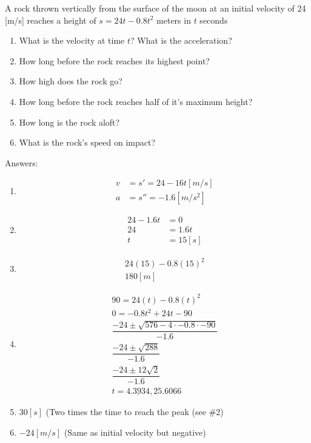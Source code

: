 \begin{example}
    A rock thrown vertically from the surface of the moon at an initial velocity of 24 [m/s] reaches a height of $s = 24t - 0.8t^2$ meters in $t$ seconds
    \begin{enumerate}
        \item What is the velocity at time $t$? What is the acceleration?
        \item How long before the rock reaches its highest point?
        \item How high does the rock go?
        \item How long before the rock reaches half of it's maximum height?
        \item How long is the rock aloft?
        \item What is the rock's speed on impact?
    \end{enumerate}
    Answers:
    \begin{enumerate}
        \item \begin{align*}
            v &= s' = 24 - 16t [m/s] \\
            a &= s'' = -1.6 [m/s^2]
        \end{align*}
        \item \begin{align*}
            24 - 1.6t &= 0 \\
            24 &= 1.6t \\
            t &= 15 [s]
        \end{align*}
        \item \begin{gather*}
            24\left(15\right) - 0.8 \left(15\right)^2 \\
            180[m]
        \end{gather*}
        \item \begin{gather*}
            90 = 24\left(t\right) - 0.8\left(t\right)^2 \\
            0 = -0.8t^2 + 24t - 90 \\
            \dfrac{-24 \pm \sqrt{576 - 4 \cdot -0.8 \cdot -90}}{-1.6} \\
            \dfrac{-24 \pm \sqrt{288}}{-1.6} \\
            \dfrac{-24 \pm 12\sqrt{2}}{-1.6} \\
            t = \underline{4.3934}, 25.6066
        \end{gather*}
        \item $30 [s]$ (Two times the time to reach the peak (see \#2)
        \item $-24 [m/s]$ (Same as initial velocity but negative)
    \end{enumerate}
\end{example}
